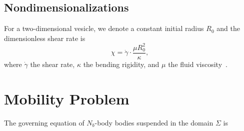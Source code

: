 \documentclass[lineno]{jfm}
\begin{document}
\subsection{Nondimensionalizations}



For a two-dimensional vesicle, we denote a constant initial radius $R_0$ and 
the dimensionless shear rate is
\begin{equation}
\chi = \dot\gamma \cdot\frac{\mu R_0^2}{\kappa},
\end{equation}
%
where $\dot\gamma$ the shear rate, $\kappa$ the bending rigidity, and $\mu$ the fluid viscosity~\cite{Finken08}.




\section{\label{mobility}Mobility Problem}

The governing equation of $N_b$-body bodies suspended in the domain $\Sigma$ is
 
\end{document}
